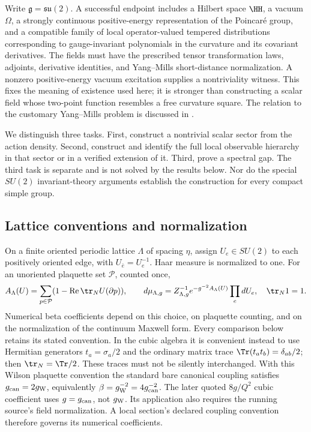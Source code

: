 Write \(\mathfrak g=\mathfrak{su}(2)\). A successful endpoint includes a
Hilbert space \(\HH\), a vacuum \(\Omega\), a strongly continuous
positive-energy representation of the Poincar\'e group, and a compatible
family of local operator-valued tempered distributions corresponding to
gauge-invariant polynomials in the curvature and its covariant
derivatives. The fields must have the prescribed tensor transformation
laws, adjoints, derivative identities, and Yang--Mills short-distance
normalization. A nonzero positive-energy vacuum excitation supplies a
nontriviality witness. This fixes the meaning of existence used here;
it is stronger than constructing a scalar field whose two-point function
resembles a free curvature square. The relation to the customary
Yang--Mills problem is discussed in \cite{JaffeWitten}.

We distinguish three tasks. First, construct a nontrivial scalar sector
from the action density. Second, construct and identify the full local
observable hierarchy in that sector or in a verified extension of it.
Third, prove a spectral gap. The third task is separate and is not solved
by the results below. Nor do the special \(SU(2)\) invariant-theory
arguments establish the construction for every compact simple group.

\subsection{Lattice conventions and normalization}

On a finite oriented periodic lattice \(\Lambda\) of spacing \(\eta\),
assign \(U_e\in SU(2)\) to each positively oriented edge, with
\(U_{\bar e}=U_e^{-1}\). Haar measure is normalized to one. For an
unoriented plaquette set \(\mathcal P\), counted once,
\begin{equation}
 A_\Lambda(U)=\sum_{p\in\mathcal P}
       (1-\operatorname{Re}\tr_N U(\partial p)),\qquad
 d\mu_{\Lambda,g}=Z_{\Lambda,g}^{-1}e^{-g^{-2}A_\Lambda(U)}\prod_e dU_e,
 \quad \tr_N 1=1. \label{eq:wilson}
\end{equation}
Numerical beta coefficients depend on this choice, on plaquette counting,
and on the normalization of the continuum Maxwell form. Every comparison
below retains its stated convention. In the cubic algebra it is convenient
instead to use Hermitian generators \(t_a=\sigma_a/2\) and the ordinary
matrix trace \(\Tr(t_at_b)=\delta_{ab}/2\); then
\(\tr_N=\Tr/2\). These traces must not be silently interchanged. With
this Wilson plaquette convention the standard bare canonical coupling
satisfies \(g_{\rm can}=2g_{\rm W}\), equivalently
\(\beta=g_{\rm W}^{-2}=4g_{\rm can}^{-2}\). The later quoted
\(8g/Q^2\) cubic coefficient uses \(g=g_{\rm can}\), not
\(g_{\rm W}\). Its application also requires the running source's field
normalization. A local section's declared coupling convention therefore
governs its numerical coefficients.

